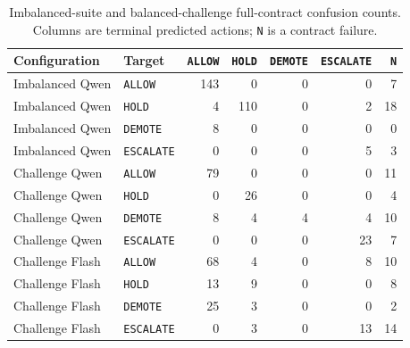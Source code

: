 \documentclass[10pt]{article}
\newcommand{\allow}{\texttt{ALLOW}}
\newcommand{\hold}{\texttt{HOLD}}
\newcommand{\demote}{\texttt{DEMOTE}}
\newcommand{\escalate}{\texttt{ESCALATE}}
\begin{document}
\begin{table}[htbp]
\centering
\footnotesize
\setlength{\tabcolsep}{3.5pt}
\caption{Imbalanced-suite and balanced-challenge full-contract confusion counts. Columns are terminal predicted
actions; \texttt{N} is a contract failure.}
\label{tab:evidence-confusion}
\begin{tabular}{@{}llrrrrr@{}}
\toprule
Configuration & Target & \allow{} & \hold{} & \demote{} & \escalate{} & \texttt{N} \\
\midrule
Imbalanced Qwen & \allow{} & 143 & 0 & 0 & 0 & 7 \\
Imbalanced Qwen & \hold{} & 4 & 110 & 0 & 2 & 18 \\
Imbalanced Qwen & \demote{} & 8 & 0 & 0 & 0 & 0 \\
Imbalanced Qwen & \escalate{} & 0 & 0 & 0 & 5 & 3 \\
\midrule
Challenge Qwen & \allow{} & 79 & 0 & 0 & 0 & 11 \\
Challenge Qwen & \hold{} & 0 & 26 & 0 & 0 & 4 \\
Challenge Qwen & \demote{} & 8 & 4 & 4 & 4 & 10 \\
Challenge Qwen & \escalate{} & 0 & 0 & 0 & 23 & 7 \\
\midrule
Challenge Flash & \allow{} & 68 & 4 & 0 & 8 & 10 \\
Challenge Flash & \hold{} & 13 & 9 & 0 & 0 & 8 \\
Challenge Flash & \demote{} & 25 & 3 & 0 & 0 & 2 \\
Challenge Flash & \escalate{} & 0 & 3 & 0 & 13 & 14 \\
\bottomrule
\end{tabular}
\end{table}
\end{document}
